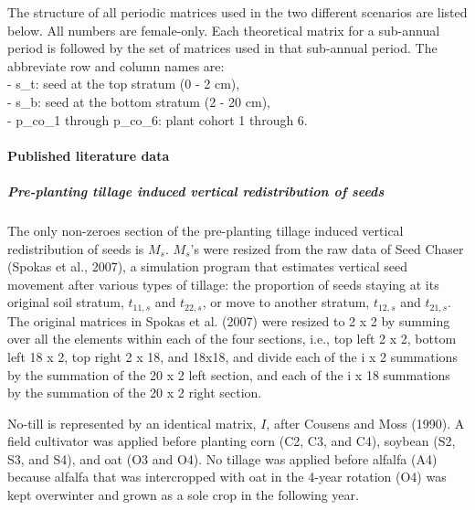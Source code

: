 \documentclass[
]{article}
\author{}
\date{\vspace{-2.5em}}
\begin{document}
The structure of all periodic matrices used in the two different scenarios are listed below. All numbers are female-only. Each theoretical matrix for a sub-annual period is followed by the set of matrices used in that sub-annual period. The abbreviate row and column names are:\\
- s\_t: seed at the top stratum (0 - 2 cm),\\
- s\_b: seed at the bottom stratum (2 - 20 cm),\\
- p\_co\_1 through p\_co\_6: plant cohort 1 through 6.

\hypertarget{published-literature-data}{%
\paragraph*{Published literature data}\label{published-literature-data}}

\hypertarget{pre-planting-tillage-induced-vertical-redistribution-of-seeds}{%
\subparagraph*{Pre-planting tillage induced vertical redistribution of seeds}\label{pre-planting-tillage-induced-vertical-redistribution-of-seeds}}

The only non-zeroes section of the pre-planting tillage induced vertical redistribution of seeds is \(M_s\). \(M_s\)'s were resized from the raw data of Seed Chaser (Spokas et al., 2007), a simulation program that estimates vertical seed movement after various types of tillage: the proportion of seeds staying at its original soil stratum, \(t_{11,s}\) and \(t_{22,s}\), or move to another stratum, \(t_{12,s}\) and \(t_{21,s}\). The original matrices in Spokas et al. (2007) were resized to 2 x 2 by summing over all the elements within each of the four sections, i.e., top left 2 x 2, bottom left 18 x 2, top right 2 x 18, and 18x18, and divide each of the i x 2 summations by the summation of the 20 x 2 left section, and each of the i x 18 summations by the summation of the 20 x 2 right section.

No-till is represented by an identical matrix, \(I\), after Cousens and Moss (1990). A field cultivator was applied before planting corn (C2, C3, and C4), soybean (S2, S3, and S4), and oat (O3 and O4). No tillage was applied before alfalfa (A4) because alfalfa that was intercropped with oat in the 4-year rotation (O4) was kept overwinter and grown as a sole crop in the following year.
\end{document}
